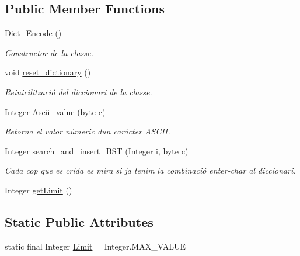 \subsection*{Public Member Functions}
\begin{DoxyCompactItemize}
\item 
\hyperlink{classdomini_1_1utils_1_1Dict__Encode_aa16372a031311494fdcae13d1a9b48c3}{Dict\+\_\+\+Encode} ()
\begin{DoxyCompactList}\small\item\em Constructor de la classe. \end{DoxyCompactList}\item 
void \hyperlink{classdomini_1_1utils_1_1Dict__Encode_a6c3016286b3bb242d12799f8e7ebb585}{reset\+\_\+dictionary} ()
\begin{DoxyCompactList}\small\item\em Reinicilització del diccionari de la classe. \end{DoxyCompactList}\item 
Integer \hyperlink{classdomini_1_1utils_1_1Dict__Encode_a12e23ecdd9b0078cb6e56c01126248b9}{Ascii\+\_\+value} (byte c)
\begin{DoxyCompactList}\small\item\em Retorna el valor númeric d\textquotesingle{}un caràcter A\+S\+C\+II. \end{DoxyCompactList}\item 
Integer \hyperlink{classdomini_1_1utils_1_1Dict__Encode_a1bafdca1835da3fa93b900ff0aa720e0}{search\+\_\+and\+\_\+insert\+\_\+\+B\+ST} (Integer i, byte c)
\begin{DoxyCompactList}\small\item\em Cada cop que es crida es mira si ja tenim la combinació enter-\/char al diccionari. \end{DoxyCompactList}\item 
Integer \hyperlink{classdomini_1_1utils_1_1Dict__Encode_a21a05b62b848a7ab9fbdf49a3a6e7edf}{get\+Limit} ()
\end{DoxyCompactItemize}
\subsection*{Static Public Attributes}
\begin{DoxyCompactItemize}
\item 
static final Integer \hyperlink{classdomini_1_1utils_1_1Dict__Encode_a48fe9a878056a119ad36a0aad2727a13}{Limit} = Integer.\+M\+A\+X\+\_\+\+V\+A\+L\+UE
\end{DoxyCompactItemize}
